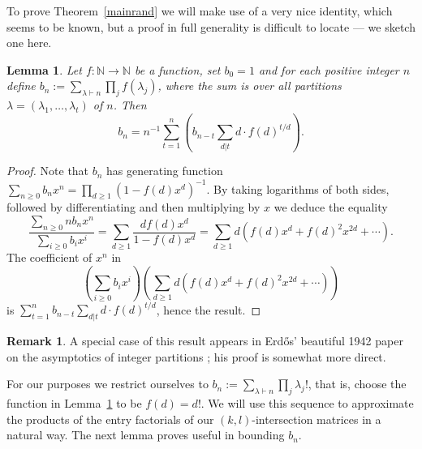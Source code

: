 \documentclass{daj}
\theoremstyle{plain}
\newtheorem{lemma}[theorem]{Lemma}
\theoremstyle{definition}
\newtheorem{remark}[theorem]{Remark}
\begin{document}
To prove Theorem~\ref{mainrand} we will make use of a very nice identity, which seems to be known, but a proof in full generality is difficult to locate --- we sketch one here.

\begin{lemma}\label{genrec}
Let $f:\mathbb{N}\to\mathbb{N}$ be a function, set $b_0=1$ and for each positive integer $n$ define $b_n:=\sum_{\lambda\vdash n}\prod_{j}f(\lambda_j)$, where the sum is over all partitions $\lambda=(\lambda_1,\dots,\lambda_t)$ of $n$. Then $$b_n=n^{-1}\sum_{t=1}^n\left(b_{n-t}\sum_{d|t}d\cdot f(d)^{t/d}\right).$$
\end{lemma}
\begin{proof}
Note that $b_n$ has generating function $\sum_{n\geq 0}b_nx^n=\prod_{d\geq 1}(1-f(d)x^d)^{-1}$. By taking logarithms of both sides, followed by differentiating and then multiplying by $x$ we deduce the equality $$\frac{\sum_{n\geq 0} nb_nx^n}{\sum_{i\geq 0}b_ix^i}=\sum_{d\geq 1}\frac{df(d)x^d}{1-f(d)x^d}=\sum_{d\geq 1}d(f(d)x^d+f(d)^2x^{2d}+\cdots).$$ The coefficient of $x^n$ in $$\left(\sum_{i\geq 0}b_ix^i\right)\left(\sum_{d\geq 1}d(f(d)x^d+f(d)^2x^{2d}+\cdots)\right)$$ is $\sum_{t=1}^nb_{n-t}\sum_{d|t}d\cdot f(d)^{t/d}$, hence the result.
\end{proof}
\begin{remark}
A special case of this result appears in Erd\H{o}s' beautiful 1942 paper on the asymptotics of integer partitions \cite{erdos}; his proof is somewhat more direct.
\end{remark}

For our purposes we restrict ourselves to $b_n:=\sum_{\lambda\vdash n}\prod_{j}\lambda_j!$, that is, choose the function in Lemma~\ref{genrec} to be $f(d)=d!$. We will use this sequence to approximate the products of the entry factorials of our $(k,l)$-intersection matrices in a natural way. The next lemma proves useful in bounding $b_n$.
\end{document}
